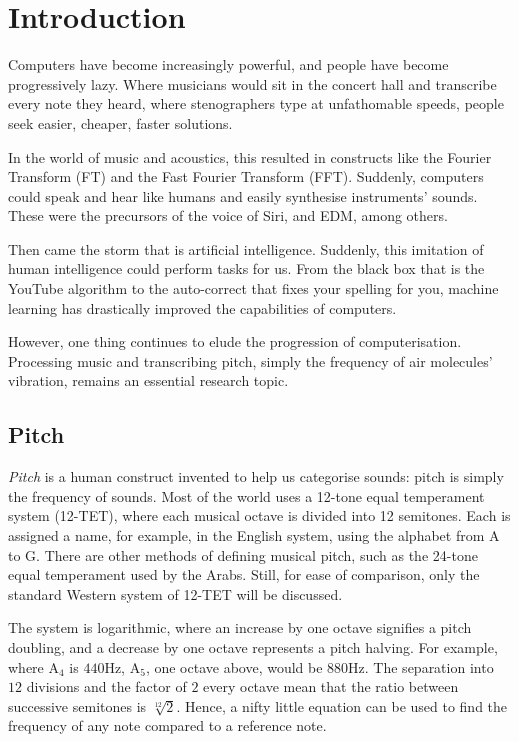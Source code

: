 \documentclass{article}
\begin{document}


\section{Introduction}

Computers have become increasingly powerful, and people have become progressively lazy. Where musicians would sit in the concert hall and transcribe every note they heard, where stenographers type at unfathomable speeds, people seek easier, cheaper, faster solutions.

In the world of music and acoustics, this resulted in constructs like the Fourier Transform (FT) and the Fast Fourier Transform (FFT). Suddenly, computers could speak and hear like humans and easily synthesise instruments' sounds. These were the precursors of the voice of Siri, and EDM, among others.

Then came the storm that is artificial intelligence. Suddenly, this imitation of human intelligence could perform tasks for us. From the black box that is the YouTube algorithm to the auto-correct that fixes your spelling for you, machine learning has drastically improved the capabilities of computers.

However, one thing continues to elude the progression of computerisation. Processing music and transcribing pitch, simply the frequency of air molecules' vibration, remains an essential research topic. 

\subsection{Pitch}

\emph{Pitch} is a human construct invented to help us categorise sounds: pitch is simply the frequency of sounds. Most of the world uses a 12-tone equal temperament system (12-TET), where each musical octave is divided into 12 semitones. Each is assigned a name, for example, in the English system, using the alphabet from A to G. There are other methods of defining musical pitch, such as the 24-tone equal temperament used by the Arabs. Still, for ease of comparison, only the standard Western system of 12-TET will be discussed.

The system is logarithmic, where an increase by one octave signifies a pitch doubling, and a decrease by one octave represents a pitch halving. For example, where A$_4$ is $440$Hz, A$_5$, one octave above, would be $880$Hz. The separation into $12$ divisions and the factor of $2$ every octave mean that the ratio between successive semitones is $\sqrt[12]{2}$. Hence, a nifty little equation can be used to find the frequency of any note compared to a reference note.
\end{document}
